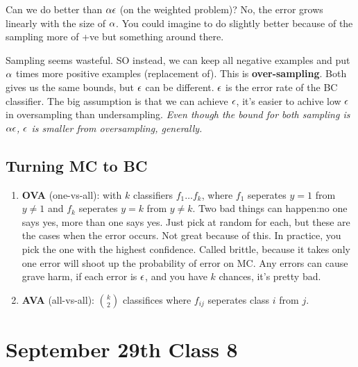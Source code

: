 Can we do better than $\alpha \epsilon$ (on the weighted problem)? No, the
error grows linearly with the size of $\alpha$. You could imagine to do
slightly better because of the sampling more of +ve but something
around there.

Sampling seems wasteful. SO instead, we can keep all negative
examples and put $\alpha$ times more positive examples (replacement
of). This is \textbf{over-sampling}. Both gives us the same bounds,
but $\epsilon$ can be different. $\epsilon$ is the error rate of the BC
classifier. The big assumption is that we can achieve $\epsilon$, it's
easier to achive low $\epsilon$ in oversampling than undersampling. \emph{Even
though the bound for both sampling is $\alpha\epsilon$, $\epsilon$ is smaller
from oversampling, generally.}

\subsection{Turning MC to BC}
\label{sec:MC2BC}

\begin{enumerate}
\item \textbf{OVA} (one-vs-all): with $k$ classifiers $f_1\dots f_k$, where $f_1$ seperates
  $y=1$ from $y\neq 1$ and $f_k$ seperates $y=k$ from $y\neq k$. Two
  bad things can happen:no one says yes, more than one says yes. Just
  pick at random for each, but these are the cases when the error
  occurs. Not great because of this. In practice, you pick the one
  with the highest confidence. Called brittle, because it takes only
  one error will shoot up the probability of error on MC. Any errors
 can cause grave harm, if each error is $\epsilon$, and you have $k$
 chances, it's pretty bad.
\item \textbf{AVA} (all-vs-all): $ k \choose 2 $ classifices where
  $f_{ij}$ seperates class $i$ from $j$.
\end{enumerate}

\pagebreak

\section{September 29th Class 8}
\label{sec:class8}

